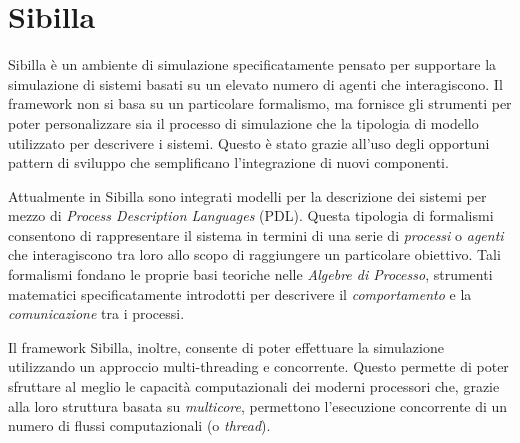 \section*{Sibilla}
Sibilla \`e un ambiente di simulazione specificatamente pensato per supportare la simulazione di sistemi basati su un elevato numero di agenti che interagiscono.
%
Il framework non si basa su un particolare formalismo, ma fornisce gli strumenti per poter personalizzare sia il processo di simulazione che la tipologia di modello utilizzato per descrivere i sistemi.
%
Questo \`e stato grazie all'uso degli opportuni pattern di sviluppo che semplificano l'integrazione di nuovi componenti.

Attualmente in Sibilla sono integrati modelli per la descrizione dei sistemi per mezzo di \emph{Process Description Languages} (PDL). Questa tipologia di formalismi consentono di rappresentare il sistema in termini di una serie di \emph{processi} o \emph{agenti} che interagiscono tra loro allo scopo di raggiungere un particolare obiettivo.
%
Tali formalismi fondano le proprie basi teoriche nelle \emph{Algebre di Processo}, strumenti matematici specificatamente introdotti per descrivere il \emph{comportamento} e la \emph{comunicazione} tra i processi.

Il framework Sibilla, inoltre, consente di poter effettuare la simulazione utilizzando un approccio multi-threading e concorrente. 
%
Questo permette di poter sfruttare al meglio le capacit\`a computazionali dei moderni processori che, grazie alla loro struttura basata su \emph{multicore}, permettono l'esecuzione concorrente di un numero di flussi computazionali (o \emph{thread}).